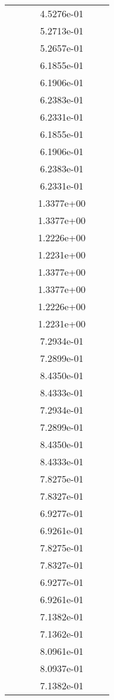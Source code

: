 \begin{xltabular}{\textwidth}{r|rS[table-format=1.3e+2]S[table-format=1.4e+2]S[table-format=1.4e+2]S[table-format=-1.5]}
&  &  & 4.5276e-01 & & \\
&  &  & 5.2713e-01 & & \\
&  &  & 5.2657e-01 & & \\
&  &  & 6.1855e-01 & & \\
&  &  & 6.1906e-01 & & \\
&  &  & 6.2383e-01 & & \\
&  &  & 6.2331e-01 & & \\
&  &  & 6.1855e-01 & & \\
&  &  & 6.1906e-01 & & \\
&  &  & 6.2383e-01 & & \\
&  &  & 6.2331e-01 & & \\
&  &  & 1.3377e+00 & & \\
&  &  & 1.3377e+00 & & \\
&  &  & 1.2226e+00 & & \\
&  &  & 1.2231e+00 & & \\
&  &  & 1.3377e+00 & & \\
&  &  & 1.3377e+00 & & \\
&  &  & 1.2226e+00 & & \\
&  &  & 1.2231e+00 & & \\
&  &  & 7.2934e-01 & & \\
&  &  & 7.2899e-01 & & \\
&  &  & 8.4350e-01 & & \\
&  &  & 8.4333e-01 & & \\
&  &  & 7.2934e-01 & & \\
&  &  & 7.2899e-01 & & \\
&  &  & 8.4350e-01 & & \\
&  &  & 8.4333e-01 & & \\
&  &  & 7.8275e-01 & & \\
&  &  & 7.8327e-01 & & \\
&  &  & 6.9277e-01 & & \\
&  &  & 6.9261e-01 & & \\
&  &  & 7.8275e-01 & & \\
&  &  & 7.8327e-01 & & \\
&  &  & 6.9277e-01 & & \\
&  &  & 6.9261e-01 & & \\
&  &  & 7.1382e-01 & & \\
&  &  & 7.1362e-01 & & \\
&  &  & 8.0961e-01 & & \\
&  &  & 8.0937e-01 & & \\
&  &  & 7.1382e-01 & & \\

\end{xltabular}
